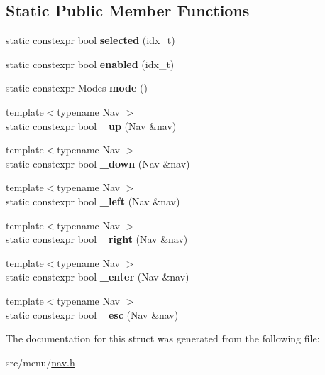 \subsection*{Static Public Member Functions}
\begin{DoxyCompactItemize}
\item 
\mbox{\label{structDrift_a6260e45ffc337523248c743c214844fc}} 
static constexpr bool {\bfseries selected} (idx\+\_\+t)
\item 
\mbox{\label{structDrift_ab522b977256dd79511c0c4937753a121}} 
static constexpr bool {\bfseries enabled} (idx\+\_\+t)
\item 
\mbox{\label{structDrift_a88f5e9078152058b38f6815e80a712b1}} 
static constexpr Modes {\bfseries mode} ()
\item 
\mbox{\label{structDrift_ae224efc028a86e9c3ac9dcedabe0df7a}} 
{\footnotesize template$<$typename Nav $>$ }\\static constexpr bool {\bfseries \+\_\+up} (Nav \&nav)
\item 
\mbox{\label{structDrift_abae8736b1ace13ea08f30e245551f725}} 
{\footnotesize template$<$typename Nav $>$ }\\static constexpr bool {\bfseries \+\_\+down} (Nav \&nav)
\item 
\mbox{\label{structDrift_aae453d31807686fd21326ab90ed32662}} 
{\footnotesize template$<$typename Nav $>$ }\\static constexpr bool {\bfseries \+\_\+left} (Nav \&nav)
\item 
\mbox{\label{structDrift_a69fc62d24473157d5966b178119f31fc}} 
{\footnotesize template$<$typename Nav $>$ }\\static constexpr bool {\bfseries \+\_\+right} (Nav \&nav)
\item 
\mbox{\label{structDrift_a701c7e60548c5b4490cb9662a089d08d}} 
{\footnotesize template$<$typename Nav $>$ }\\static constexpr bool {\bfseries \+\_\+enter} (Nav \&nav)
\item 
\mbox{\label{structDrift_af86c1b134806fbfb3127a6a4ca9e7ea3}} 
{\footnotesize template$<$typename Nav $>$ }\\static constexpr bool {\bfseries \+\_\+esc} (Nav \&nav)
\end{DoxyCompactItemize}


The documentation for this struct was generated from the following file\+:\begin{DoxyCompactItemize}
\item 
src/menu/\hyperlink{nav_8h}{nav.\+h}\end{DoxyCompactItemize}
